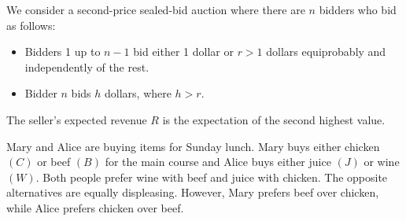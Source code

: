 \documentclass[addpoints]{exam}
\begin{document}
\begin{questions}
    \droptotalpoints

    \question 	      	      We consider a second-price sealed-bid auction where there are $n$ bidders who bid as follows:
    \begin{itemize}
        \item Bidders 1 up to $n-1$ bid either 1 dollar or $r > 1$ dollars equiprobably and
              independently of the rest.
        \item Bidder $n$ bids $h$ dollars, where $h > r$.
    \end{itemize}
    The seller's expected revenue $R$ is the expectation of the second highest value.
    \droptotalpoints

    \question 	      Mary and Alice are buying items for Sunday lunch. Mary buys either chicken $(C)$ or beef $(B)$ for the main course and Alice buys either juice $(J)$
    or wine $(W)$. Both people prefer wine with beef and juice with chicken. The opposite alternatives are equally displeasing.
    However, Mary prefers beef over chicken, while Alice prefers chicken over beef.


\end{questions}
\end{document}
